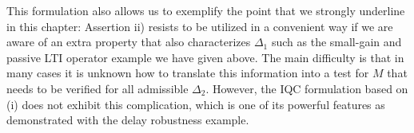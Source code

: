 This formulation also allows us to exemplify the point that we strongly underline in this chapter: Assertion ii) 
resists to be utilized in a convenient way if we are aware of an extra property that also characterizes $\Delta_1$ 
such as the small-gain and passive LTI operator example we have given above. 
The main difficulty is that in many cases it is unknown how to translate this information into a test for $M$ that needs 
to be verified for all admissible $\Delta_2$. However, the IQC formulation based on (i) does not exhibit this 
complication, which is one of its powerful features as demonstrated with the delay robustness example. 
